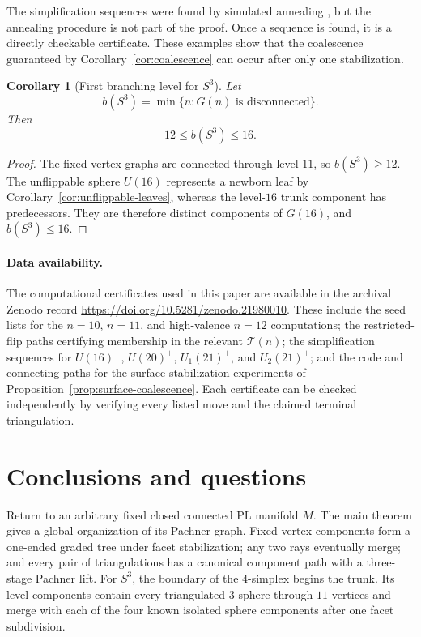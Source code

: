 \documentclass[11pt]{article}
\newtheorem{corollary}[theorem]{Corollary}
\theoremstyle{remark}
\theoremstyle{plain}
\begin{document}
The simplification sequences were found by simulated annealing
\cite{BL00,JLL22}, but the annealing procedure is not part of the proof.  Once
a sequence is found, it is a directly checkable certificate.  These examples
show that the coalescence guaranteed by Corollary~\ref{cor:coalescence}
can occur after only one stabilization.

\begin{corollary}[First branching level for \(S^3\)]
\label{cor:first-branching-bound}
Let
\[
 b(S^3)=\min\{n:G(n)\text{ is disconnected}\}.
\]
Then
\[
 12\le b(S^3)\le16.
\]
\end{corollary}

\smallskip
\begin{proof}
The fixed-vertex graphs are connected through level \(11\), so
\(b(S^3)\ge12\).  The unflippable sphere \(U(16)\) represents a newborn leaf
by Corollary~\ref{cor:unflippable-leaves}, whereas the level-\(16\) trunk
component has predecessors.  They are therefore distinct components of
\(G(16)\), and \(b(S^3)\le16\).
\end{proof}

\paragraph{Data availability.}
The computational certificates used in this paper are available in the
archival Zenodo record \url{https://doi.org/10.5281/zenodo.21980010}.  These
include the seed lists for the \(n=10\),
\(n=11\), and high-valence \(n=12\) computations; the restricted-flip paths
certifying membership in the relevant \(\mathcal T(n)\); the simplification
sequences for \(U(16)^{+}\), \(U(20)^{+}\), \(U_1(21)^{+}\), and \(U_2(21)^{+}\);
and the code and connecting paths for the surface stabilization experiments
of Proposition~\ref{prop:surface-coalescence}.  Each certificate can be
checked independently by verifying every listed move and the claimed terminal
triangulation.

\section{Conclusions and questions}
\label{sec:conclusions}

Return to an arbitrary fixed closed connected PL manifold \(M\).  The main
theorem gives a global organization of its Pachner graph.  Fixed-vertex
components form a one-ended graded tree under facet stabilization; any two rays eventually merge; and every pair of
triangulations has a canonical component path with a three-stage Pachner
lift.  For \(S^3\), the boundary of the \(4\)-simplex begins the trunk.  Its level components
contain every triangulated \(3\)-sphere through \(11\) vertices and merge
with each of the four known isolated sphere components after one facet
subdivision.
\end{document}
